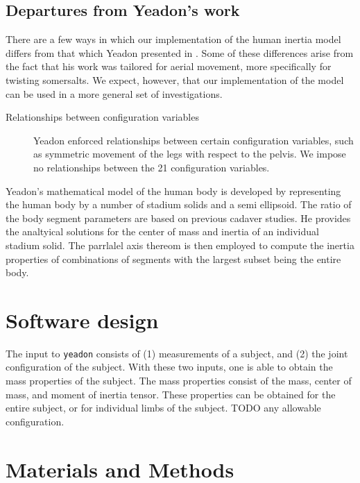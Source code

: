 \documentclass[10pt]{article}
\begin{document}
\subsection*{Departures from Yeadon's work}

There are a few ways in which our implementation of the human inertia model
differs from that which Yeadon presented in \cite{Yeadon1990c, Yeadon1990f,
Yeadon1990e, Yeadon1990d}. Some of these differences arise from the fact that
his work was tailored for aerial movement, more specifically for twisting
somersalts. We expect, however, that our implementation of the model can be
used in a more general set of investigations.

\begin{description}
    \item[Relationships between configuration variables] Yeadon enforced
        relationships between certain configuration variables, such as
        symmetric movement of the legs with respect to the pelvis. We impose no
        relationships between the 21 configuration variables.
\end{description}




Yeadon's mathematical model of the human body is developed by representing the
human body by a number of stadium solids and a semi ellipsoid. The ratio of the
body segment parameters are based on previous cadaver studies. He provides the
analtyical solutions for the center of mass and inertia of an individual
stadium solid. The parrlalel axis thereom is then employed to compute the
inertia properties of combinations of segments with the largest subset being
the entire body.


\section*{Software design}

The input to \verb+yeadon+ consists of (1) measurements of a subject, and (2)
the joint configuration of the subject. With these two inputs, one is able to
obtain the mass properties of the subject.
The mass properties consist of the mass, center of mass, and moment of inertia
tensor. These properties can be obtained for the entire subject, or for
individual limbs of the subject. TODO any allowable configuration.

\section*{Materials and Methods}
\end{document}
